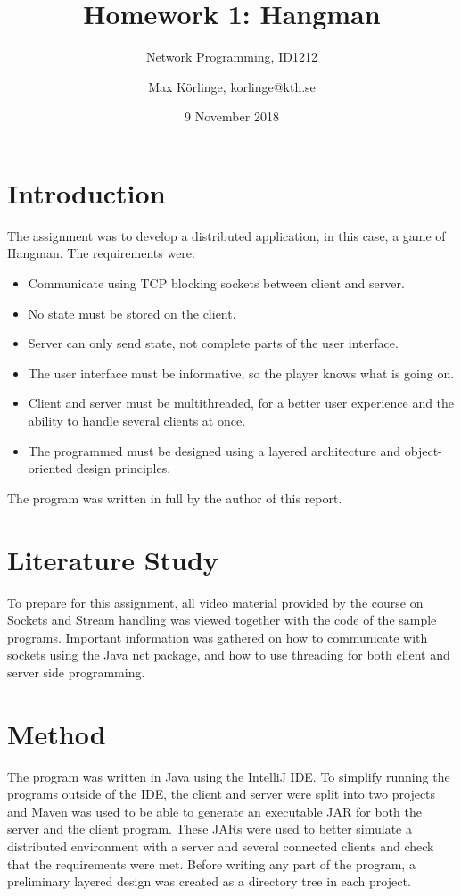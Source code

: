 \documentclass[a4paper]{scrartcl}
\title{Homework 1: Hangman}
\subtitle{Network Programming, ID1212}
\author{Max Körlinge, korlinge@kth.se}
\date{9 November 2018}
\begin{document}
\maketitle


\section{Introduction}

\noindent The assignment was to develop a distributed application, in this case, a game of Hangman. The requirements were:

\begin{itemize}
    \item Communicate using TCP blocking sockets between client and server.
    \item No state must be stored on the client.
    \item Server can only send state, not complete parts of the user interface.
    \item The user interface must be informative, so the player knows what is going on.
    \item Client and server must be multithreaded, for a better user experience and the ability to handle several clients at once.
    \item The programmed must be designed using a layered architecture and object-oriented design principles.
\end{itemize}

The program was written in full by the author of this report.

\section{Literature Study}

To prepare for this assignment, all video material provided by the course on Sockets and Stream handling was viewed together with the code of the sample programs. Important information was gathered on how to communicate with sockets using the Java net package, and how to use threading for both client and server side programming.

\section{Method}

\noindent The program was written in Java using the IntelliJ IDE. To simplify running the programs outside of the IDE, the client and server were split into two projects and Maven was used to be able to generate an executable JAR for both the server and the client program. These JARs were used to better simulate a distributed environment with a server and several connected clients and check that the requirements were met. Before writing any part of the program, a preliminary layered design was created as a directory tree in each project.
\end{document}
